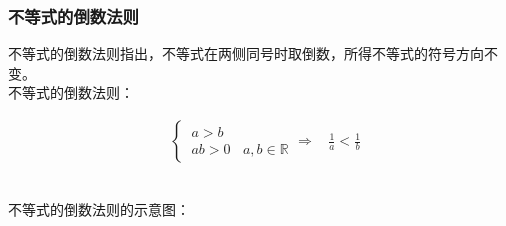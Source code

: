 \documentclass[UTF8]{ctexart}
\begin{document}
\newpage

    \subsubsection{不等式的倒数法则}
    不等式的倒数法则指出，不等式在两侧同号时取倒数，所得不等式的符号方向不变。\\[3mm]
    不等式的倒数法则：
    \begin{large}
        \begin{align*}
            &\begin{cases}
                ~a>b\\[3mm]
                ~ab>0~~~~a,b\in\mathbb{R}
            \end{cases}
            \Longrightarrow~~~~\frac{1}{a}<\frac{1}{b}
        \end{align*}
    \end{large}\\
    不等式的倒数法则的示意图：
\end{document}
